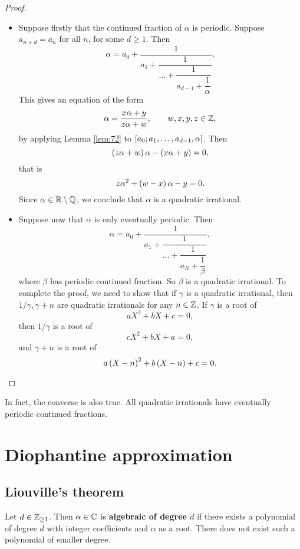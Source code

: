 \begin{proof}
\hfill
\begin{itemize}
\item Suppose firstly that the continued fraction of $ \alpha $ is periodic. Suppose $ a_{n + d} = a_n $ for all $ n $, for some $ d \ge 1 $. Then
$$ \alpha = a_0 + \dfrac{1}{a_1 + \dfrac{1}{\dots + \dfrac{1}{a_{d - 1} + \dfrac{1}{\alpha}}}}. $$
This gives an equation of the form
$$ \alpha = \dfrac{x\alpha + y}{z\alpha + w}, \qquad w, x, y, z \in \Z, $$
by applying Lemma \ref{lem:72} to $ \sb{a_0; a_1, \dots, a_{d - 1}, \alpha} $. Then
$$ \rb{z\alpha + w}\alpha - \rb{x\alpha + y} = 0, $$
that is
$$ z\alpha^2 + \rb{w - x}\alpha - y = 0. $$
Since $ \alpha \in \R \setminus \Q $, we conclude that $ \alpha $ is a quadratic irrational.
\item Suppose now that $ \alpha $ is only eventually periodic. Then
$$ \alpha = a_0 + \dfrac{1}{a_1 + \dfrac{1}{\dots + \dfrac{1}{a_N + \dfrac{1}{\beta}}}}, $$
where $ \beta $ has periodic continued fraction. So $ \beta $ is a quadratic irrational. To complete the proof, we need to show that if $ \gamma $ is a quadratic irrational, then $ 1 / \gamma, \gamma + n $ are quadratic irrationals for any $ n \in \Z $. If $ \gamma $ is a root of
$$ aX^2 + bX + c = 0, $$
then $ 1 / \gamma $ is a root of
$$ cX^2 + bX + a = 0, $$
and $ \gamma + n $ is a root of
$$ a\rb{X - n}^2 + b\rb{X - n} + c = 0. $$
\end{itemize}
\end{proof}

In fact, the converse is also true. All quadratic irrationals have eventually periodic continued fractions.

\pagebreak

\section{Diophantine approximation}

\subsection{Liouville's theorem}

\begin{definition}
Let $ d \in \Z_{\ge 1} $. Then $ \alpha \in \C $ is \textbf{algebraic of degree $ d $} if there exists a polynomial of degree $ d $ with integer coefficients and $ \alpha $ as a root. There does not exist such a polynomial of smaller degree.
\end{definition}

